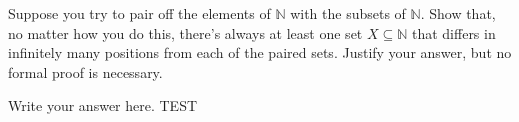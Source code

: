 \documentclass{article}
\renewcommand{\(}{\left(}
\renewcommand{\)}{\right)}
\theoremstyle{plain}
\theoremstyle{plain}
\theoremstyle{definition}
\begin{document}
Suppose you try to pair off the elements of $\mathbb{N}$ with the subsets of $\mathbb{N}$. Show that, no matter how you do this, there's always at least one set $X \subseteq \mathbb{N}$ that differs in infinitely many positions from each of the paired sets. Justify your answer, but no formal proof is necessary.

\begin{shaded}
Write your answer here. TEST
\end{shaded}
\end{document}
